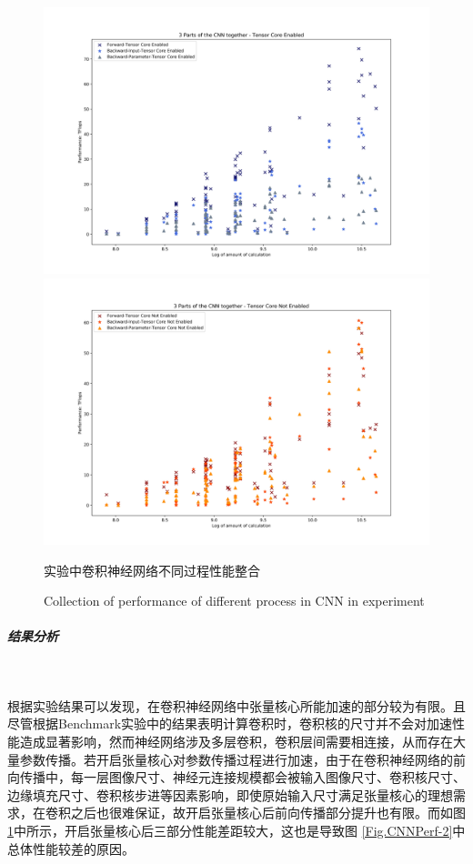 \begin{figure}
	\centering
	\includegraphics[width=15cm]{figures/CNN-HALF-3PART-TF.jpg}\\
	\includegraphics[width=15cm]{figures/CNN-HALF-3PART-NOTF.jpg}
	\renewcommand{\thefigure}{\arabic{section}-\arabic{figure} }
	\renewcommand{\figurename}{图}
	\caption{实验中卷积神经网络不同过程性能整合}
	\addtocounter{figure}{-1}
	\renewcommand{\thefigure}{\arabic{section}-\arabic{figure} }
	\renewcommand{\figurename}{Figure}
	\caption{Collection of performance of different process in CNN in experiment}
	\label{Fig.CNNPerf3Part}
\end{figure}
\subparagraph{结果分析}~{}
\par 根据实验结果可以发现，在卷积神经网络中张量核心所能加速的部分较为有限。且尽管根据Benchmark实验中的结果表明计算卷积时，卷积核的尺寸并不会对加速性能造成显著影响，然而神经网络涉及多层卷积，卷积层间需要相连接，从而存在大量参数传播。若开启张量核心对参数传播过程进行加速，由于在卷积神经网络的前向传播中，每一层图像尺寸、神经元连接规模都会被输入图像尺寸、卷积核尺寸、边缘填充尺寸、卷积核步进等因素影响，即使原始输入尺寸满足张量核心的理想需求，在卷积之后也很难保证，故开启张量核心后前向传播部分提升也有限。而如图 \ref{Fig.CNNPerf3Part}中所示，开启张量核心后三部分性能差距较大，这也是导致图 \ref{Fig.CNNPerf-2}中总体性能较差的原因。
